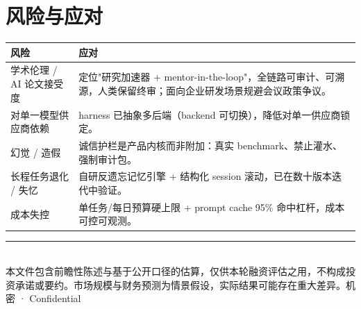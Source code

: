 \documentclass[UTF8,11pt,fontset=none]{ctexart}
\newcommand{\thd}[1]{\textbf{\color{white}#1}}
\newcommand{\headrow}{\rowcolor{argusnavy}}
\newcommand{\altrow}{\rowcolor{arguslight}}
\begin{document}
\section{风险与应对}

\begin{tabularx}{\textwidth}{@{}>{\raggedright\arraybackslash}p{4.6cm} X@{}}
\toprule
\headrow \thd{风险} & \thd{应对} \\
\midrule
\altrow 学术伦理 / AI 论文接受度 & 定位"研究加速器 + mentor-in-the-loop"，全链路可审计、可溯源，人类保留终审；面向企业研发场景规避会议政策争议。 \\
对单一模型供应商依赖 & harness 已抽象多后端（backend 可切换），降低对单一供应商锁定。 \\
\altrow 幻觉 / 造假 & 诚信护栏是产品内核而非附加：真实 benchmark、禁止灌水、强制审计包。 \\
长程任务退化 / 失忆 & 自研反遗忘记忆引擎 + 结构化 session 滚动，已在数十版本迭代中验证。 \\
\altrow 成本失控 & 单任务/每日预算硬上限 + prompt cache 95\% 命中杠杆，成本可控可观测。 \\
\bottomrule
\end{tabularx}

\vspace{1.2em}
{\color{argusline}\rule{\textwidth}{1pt}}\\[0.4em]
{\sffamily\color{argusgray}\small 本文件包含前瞻性陈述与基于公开口径的估算，仅供本轮融资评估之用，不构成投资承诺或要约。市场规模与财务预测为情景假设，实际结果可能存在重大差异。\hfill 机密 · Confidential}
\end{document}
